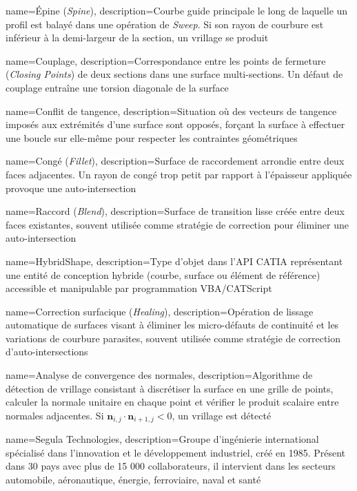 {
    name=Épine (\textit{Spine}),
    description={Courbe guide principale le long de laquelle un profil est balayé dans une opération de \textit{Sweep}. Si son rayon de courbure est inférieur à la demi-largeur de la section, un vrillage se produit}
}

{
    name=Couplage,
    description={Correspondance entre les points de fermeture (\textit{Closing Points}) de deux sections dans une surface multi-sections. Un défaut de couplage entraîne une torsion diagonale de la surface}
}

{
    name=Conflit de tangence,
    description={Situation où des vecteurs de tangence imposés aux extrémités d'une surface sont opposés, forçant la surface à effectuer une boucle sur elle-même pour respecter les contraintes géométriques}
}

{
    name=Congé (\textit{Fillet}),
    description={Surface de raccordement arrondie entre deux faces adjacentes. Un rayon de congé trop petit par rapport à l'épaisseur appliquée provoque une auto-intersection}
}

{
    name=Raccord (\textit{Blend}),
    description={Surface de transition lisse créée entre deux faces existantes, souvent utilisée comme stratégie de correction pour éliminer une auto-intersection}
}

{
    name=HybridShape,
    description={Type d'objet dans l'API CATIA représentant une entité de conception hybride (courbe, surface ou élément de référence) accessible et manipulable par programmation VBA/CATScript}
}

{
    name=Correction surfacique (\textit{Healing}),
    description={Opération de lissage automatique de surfaces visant à éliminer les micro-défauts de continuité et les variations de courbure parasites, souvent utilisée comme stratégie de correction d'auto-intersections}
}

{
    name=Analyse de convergence des normales,
    description={Algorithme de détection de vrillage consistant à discrétiser la surface en une grille de points, calculer la normale unitaire en chaque point et vérifier le produit scalaire entre normales adjacentes. Si $\mathbf{n}_{i,j} \cdot \mathbf{n}_{i+1,j} < 0$, un vrillage est détecté}
}

{
    name=Segula Technologies,
    description={Groupe d'ingénierie international spécialisé dans l'innovation et le développement industriel, créé en 1985. Présent dans 30 pays avec plus de 15 000 collaborateurs, il intervient dans les secteurs automobile, aéronautique, énergie, ferroviaire, naval et santé}
}


